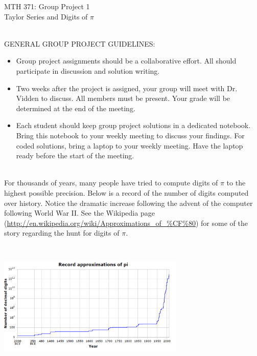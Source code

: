 \documentclass[addpoints, 11pt]{exam}
\begin{document}
\vspace{100mm}
\begin{center} \Large
MTH 371: Group Project 1 \\ Taylor Series and Digits of $\pi$ \normalsize
\end{center}
\ \\
\noindent GENERAL GROUP PROJECT GUIDELINES: 
\begin{itemize}
\item Group project assignments should be a collaborative effort. All should participate in discussion and solution writing. \vspace{-2mm}
\item Two weeks after the project is assigned, your group will meet with Dr. Vidden to discuss. All members must be present. Your grade will be determined at the end of the meeting. \vspace{-2mm}
\item Each student should keep group project solutions in a dedicated notebook. Bring this notebook to your weekly meeting to discuss your findings. For coded solutions, bring a laptop to your weekly meeting. Have the laptop ready before the start of the meeting. \vspace{-2mm}
\end{itemize}
\ \\

For thousands of years, many people have tried to compute digits of $\pi$ to the highest possible precision. Below is a record of the number of digits computed over history. Notice the dramatic increase following the advent of the computer following World War II. See the Wikipedia page (\url{http://en.wikipedia.org/wiki/Approximations_of_\%CF\%80}) for some of the story regarding the hunt for digits of $\pi$. 

\begin{center}
\includegraphics[width=3.5in, height=2.5in]{pidigits.png} 
\end{center}
\end{document}
